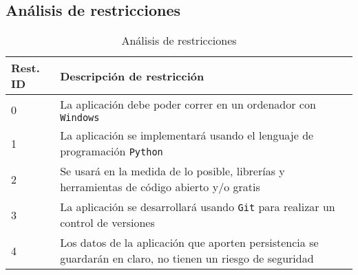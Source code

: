 \subsection{Análisis de restricciones}

\begin{table}[H]
    \begin{center}
        \begin{tabular}{p{} | p{}}
            Rest. ID & Descripción de restricción\\
            \hline
            0& La aplicación debe poder correr en un ordenador con \texttt{Windows}\\
            \hline
            1& La aplicación se implementará usando el lenguaje de programación \texttt{Python}\\
            \hline
            2& Se usará en la medida de lo posible, librerías y herramientas de código abierto y/o gratis\\
            \hline
            3& La aplicación se desarrollará usando \texttt{Git} para realizar un control de versiones\\
            \hline
            4& Los datos de la aplicación que aporten persistencia se guardarán en claro, no tienen un riesgo de seguridad\\%
            \hline
        \end{tabular} 
    \end{center}
    \caption{Análisis de restricciones}
    \label{Restricciones}
\end{table}